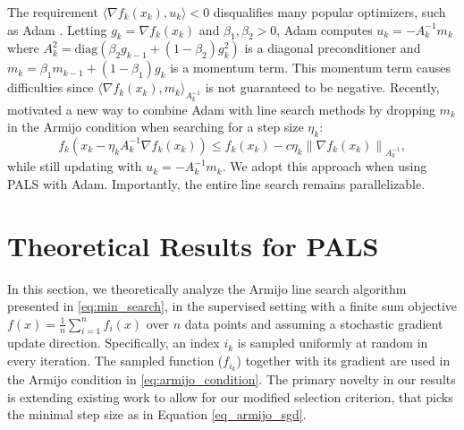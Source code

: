 \documentclass{article}
\newcommand{\todo}[1]{{\color{Yellow} (todo #1)}}
\newcommand{\xAt}[1]{x_{#1}}
\newcommand{\update}{u}
\newcommand{\updateAt}[1]{\update_{#1}}
\newcommand{\stepSize}{\eta}
\newcommand{\stepSizeAt}[1]{\stepSize_{#1}}
\newcommand{\inner}[2]{\langle #1, #2 \rangle}
\newcommand{\norm}[1]{\left \lVert #1 \right \rVert}
\begin{document}
The requirement $\inner{\nabla f_k(\xAt{k})}{\updateAt{k}} < 0$ disqualifies many popular optimizers, such as Adam \citep{kingma2015adam}. Letting $g_k = \nabla f_k(\xAt{k})$ and $\beta_1, \beta_2 > 0$, Adam computes $u_k = -A^{-1}_k m_k$ where $A_k^2 = \mathrm{diag}(\beta_2 g_{k-1} + (1 - \beta_2) g_k^2)$ is a diagonal preconditioner and $m_k = \beta_1 m_{k-1} + (1 - \beta_1) g_k$ is a momentum term. This momentum term causes difficulties since $\inner{\nabla f_k(\xAt{k})}{m_k}_{A_k^{-1}}$ is not guaranteed to be negative. Recently, \cite{vaswani2020adaptive} motivated a new way to combine Adam with line search methods by dropping $m_k$ in the Armijo condition when searching for a step size $\stepSizeAt{k}$:
%
\begin{equation}
    f_k(\xAt{k} - \stepSizeAt{k} A_k^{-1} \nabla f_k(\xAt{k})) \le f_k(\xAt{k}) - c \stepSizeAt{k} \norm{\nabla f_k(\xAt{k})}_{A_k^{-1}},
    \label{eq:adam_armijo_condition}
\end{equation}
%
while still updating with $u_k = -A_k^{-1} m_k$. We adopt this approach when using PALS with Adam. Importantly, the entire line search remains parallelizable. 



\section{Theoretical Results for PALS} \label{sec:theory}

In this section, we theoretically analyze the Armijo line search algorithm presented in \eqref{eq:min_search}, in the supervised setting with a finite sum objective  
$f(x) = \tfrac{1}{n} \sum_{i=1}^n f_i(x)$
over $n$ data points and assuming a stochastic gradient update direction.
Specifically, an index $i_k$ is sampled uniformly at random in every iteration. The sampled function ($f_{i_k}$) together with its gradient are used in the Armijo condition in \eqref{eq:armijo_condition}. The primary novelty in our results is extending existing work to allow for our modified selection criterion, that picks the minimal step size as in Equation \eqref{eq_armijo_sgd}.
\end{document}
